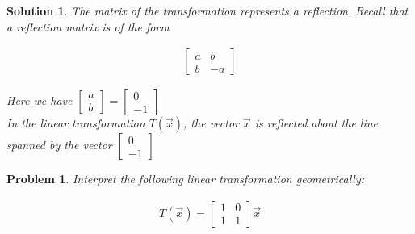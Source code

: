 \documentclass{article}
\newtheorem{problem}{Problem}
\newtheorem*{solution}{Solution}
\begin{document}
\begin{solution}
The matrix of the transformation represents a reflection. Recall that a reflection matrix is of the form 

\begin{align*}
\begin{bmatrix}
a & b \\
b & -a
\end{bmatrix}
\end{align*}

Here we have $\begin{bmatrix} a \\ b \end{bmatrix} = \begin{bmatrix} 0 \\ -1 \end{bmatrix}$ \\

In the linear transformation $T(\vec{x})$, the vector $\vec{x}$ is reflected about the line spanned by the vector $\begin{bmatrix} 0 \\ -1 \end{bmatrix}$

\end{solution}

\begin{problem}
Interpret the following linear transformation geometrically:

\begin{align*}
T(\vec{x}) =
\begin{bmatrix}
1 & 0 \\
1 & 1
\end{bmatrix} \vec{x}
\end{align*}
\end{problem}
\end{document}
